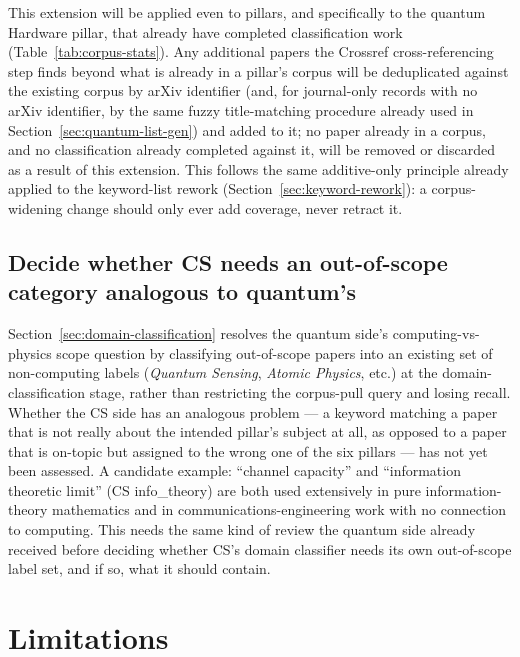 \documentclass[11pt]{article}
\begin{document}
This extension will be applied even to pillars, and specifically to the quantum
Hardware pillar, that already have completed classification work
(Table~\ref{tab:corpus-stats}). Any additional papers the Crossref cross-referencing
step finds beyond what is already in a pillar's corpus will be deduplicated against the
existing corpus by arXiv identifier (and, for journal-only records with no arXiv
identifier, by the same fuzzy title-matching procedure already used in
Section~\ref{sec:quantum-list-gen}) and added to it; no paper already in a corpus, and
no classification already completed against it, will be removed or discarded as a
result of this extension. This follows the same additive-only principle already
applied to the keyword-list rework (Section~\ref{sec:keyword-rework}): a corpus-widening
change should only ever add coverage, never retract it.

\subsection{Decide whether CS needs an out-of-scope category analogous to quantum's}
\label{sec:planned-cs-out-of-scope}

Section~\ref{sec:domain-classification} resolves the quantum side's
computing-vs-physics scope question by classifying out-of-scope papers into an
existing set of non-computing labels (\emph{Quantum Sensing}, \emph{Atomic Physics},
etc.) at the domain-classification stage, rather than restricting the corpus-pull
query and losing recall. Whether the CS side has an analogous problem --- a keyword
matching a paper that is not really about the intended pillar's subject at all, as
opposed to a paper that is on-topic but assigned to the wrong one of the six pillars
--- has not yet been assessed. A candidate example: ``channel capacity'' and
``information theoretic limit'' (CS info\_theory) are both used extensively in pure
information-theory mathematics and in communications-engineering work with no
connection to computing. This needs the same kind of review the quantum side already
received before deciding whether CS's domain classifier needs its own out-of-scope
label set, and if so, what it should contain.

\section{Limitations}
\end{document}
